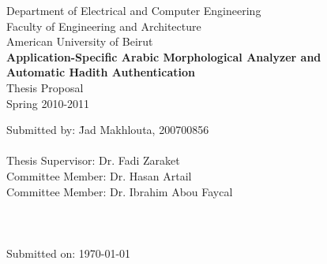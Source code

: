 \documentclass[a4,12pt]{report}
\begin{document}
%
\begin{titlepage}
\begin{center}


\large{Department of Electrical and Computer Engineering\\
Faculty of Engineering and Architecture \\
American University of Beirut\\}
\vspace{3cm}
 \LARGE \textbf{Application-Specific Arabic Morphological Analyzer and \\Automatic Hadith Authentication\\}
\vspace{1.5cm}
\LARGE {Thesis Proposal \\ Spring 2010-2011}\\
\end{center}
\vspace{3.5cm}
\begin{tabbing}



Submitted by: \quad\quad \quad \quad \=Jad Makhlouta, 200700856 \\
\\
Thesis Supervisor:  \> Dr. Fadi Zaraket \\

Committee Member: \> Dr. Hasan Artail  \\

Committee Member:  \> Dr. Ibrahim Abou Faycal \\


\\
\\
\\
Submitted on: \> \today
\end{tabbing}
\end{titlepage}


\pagestyle{fancy}
\setcounter{page}{1}
\end{document}
